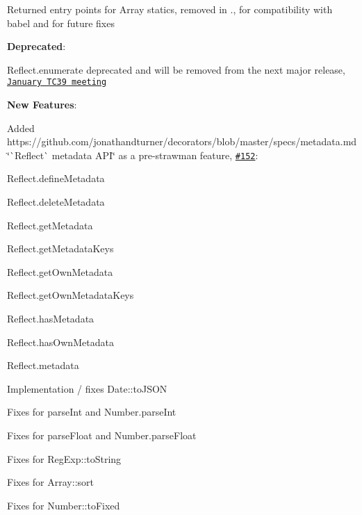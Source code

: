 \begin{DoxyItemize}
\begin{DoxyItemize}
\item Returned entry points for {\ttfamily Array} statics, removed in {.}, for compatibility with {\ttfamily babel} {} and for future fixes
\end{DoxyItemize}
\item {\bfseries Deprecated}\+:
\begin{DoxyItemize}
\item {\ttfamily Reflect.\+enumerate} deprecated and will be removed from the next major release, \href{https://github.com/rwaldron/tc39-notes/blob/master/es7/2016-01/2016-01-28.md#5xix-revisit-proxy-enumerate---revisit-decision-to-exhaust-iterator}{\tt January T\+C39 meeting}
\end{DoxyItemize}
\item {\bfseries New Features}\+:
\begin{DoxyItemize}
\item Added https\+://github.com/jonathandturner/decorators/blob/master/specs/metadata.\+md \char`\"{}\`{}\+Reflect\`{} metadata A\+P\+I\char`\"{} as a pre-\/strawman feature, \href{https://github.com/zloirock/core-js/issues/152}{\tt \#152}\+:
\begin{DoxyItemize}
\item {\ttfamily Reflect.\+define\+Metadata}
\item {\ttfamily Reflect.\+delete\+Metadata}
\item {\ttfamily Reflect.\+get\+Metadata}
\item {\ttfamily Reflect.\+get\+Metadata\+Keys}
\item {\ttfamily Reflect.\+get\+Own\+Metadata}
\item {\ttfamily Reflect.\+get\+Own\+Metadata\+Keys}
\item {\ttfamily Reflect.\+has\+Metadata}
\item {\ttfamily Reflect.\+has\+Own\+Metadata}
\item {\ttfamily Reflect.\+metadata}
\end{DoxyItemize}
\item Implementation / fixes {\ttfamily Date\+::to\+J\+S\+ON}
\item Fixes for {\ttfamily parse\+Int} and {\ttfamily Number.\+parse\+Int}
\item Fixes for {\ttfamily parse\+Float} and {\ttfamily Number.\+parse\+Float}
\item Fixes for {\ttfamily Reg\+Exp\+::to\+String}
\item Fixes for {\ttfamily Array\+::sort}
\item Fixes for {\ttfamily Number\+::to\+Fixed}

\end{DoxyItemize}
\end{DoxyItemize}
